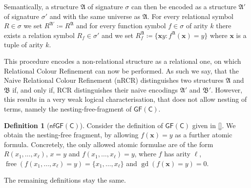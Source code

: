 \documentclass[a4paper,11pt,DIV=15]{scrartcl} %
\theoremstyle{plain}
\theoremstyle{definition}
\newtheorem{definition}[theorem]{Definition}
\newcommand{\GFC}{\mathsf{GF}(\mathsf{C})}
\newcommand{\free}[1]{\operatorname{free}(#1)}
\newcommand{\gd}[1]{\operatorname{gd}(#1)}
\begin{document}
Semantically, a structure $\mathfrak A$ of signature $\sigma$ can then be encoded as a structure $\mathfrak A'$ of signature $\sigma'$ and with the same universe as $\mathfrak A$. 
For every relational symbol $R\in\sigma$ we set $R^{\mathfrak A'}\coloneqq R^{\mathfrak A}$ and for every function symbol $f\in\sigma$ of arity $k$ there exists a relation symbol $R_f\in\sigma'$ and we set $R_f^{\mathfrak A}\coloneqq \{\mathbf xy : f^{\mathfrak A}(\mathbf x)=y\}$ where $\mathbf x$ is a tuple of arity $k$.

This procedure encodes a non-relational structure as a relational one, on which Relational Colour Refinement can now be performed.
As such we say, that the Naive Relational Colour Refinement (nRCR) distinguishes two structures $\mathfrak A$ and $\mathfrak B$ if, and only if, RCR distinguishes their naive encodings $\mathfrak A'$ and $\mathfrak B'$.
However, this results in a very weak logical characterisation, that does not allow nesting of terms, namely the nesting-free-fragment of $\GFC$.

\begin{definition}[$\mathsf{nfGF}(\mathsf C)$]
	Consider the definition of $\GFC$ given in \ref{}.
	We obtain the nesting-free fragment, by allowing $f(\mathbf x)=y$ as a further atomic formula.
	Concretely, the only allowed atomic formulae are of the form $R(x_1,\dots,x_\ell)$, $x=y$ and $f(x_1,\dots,x_\ell)=y$, where $f$ has arity $\ell$, $\free{f(x_1,\dots,x_\ell)=y}=\{x_1,\dots,x_\ell\}$ and $\gd{f(\mathbf x)=y}=0$.
	
	The remaining definitions stay the same.
\end{definition}
\end{document}
